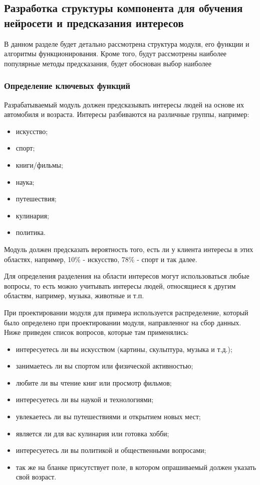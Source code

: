 \subsection{Разработка структуры компонента для обучения нейросети и предсказания интересов}

В данном разделе будет детально рассмотрена структура модуля, его функции и алгоритмы функционирования. Кроме того, будут рассмотрены наиболее популярные методы предсказания, будет обоснован выбор наиболее  


\subsubsection{Определение ключевых функций}

Разрабатываемый модуль должен предсказывать интересы людей на основе их автомобиля и возраста. Интересы разбиваются на различные группы, например:

\begin{itemize}
    \item искусство;
    \item спорт;
    \item книги/фильмы;
    \item наука;
    \item путешествия;
    \item кулинария;
    \item политика.
\end{itemize}

Модуль должен предсказать вероятность того, есть ли у клиента интересы в этих областях, например, 10\% - искусство, 78\% - спорт и так далее.

Для определения разделения на области интересов могут использоваться любые вопросы, то есть можно учитывать интересы людей, относящиеся к другим областям, например, музыка, животные и т.п.

При проектировании модуля для примера используется распределение, который было определено при проектировании модуля, направленног на сбор данных. Ниже приведен список вопросов, которые там применялись:
\begin{itemize}
    \item интересуетесь ли вы искусством (картины, скульптура, музыка и т.д.);
    \item занимаетесь ли вы спортом или физической активностью;
    \item любите ли вы чтение книг или просмотр фильмов;
    \item интересуетесь ли вы наукой и технологиями;
    \item увлекаетесь ли вы путешествиями и открытием новых мест;
    \item является ли для вас кулинария или готовка хобби;
    \item интересуетесь ли вы политикой и общественными вопросами;
    \item так же на бланке присутствует поле, в котором опрашиваемый должен указать свой возраст.
\end{itemize}

